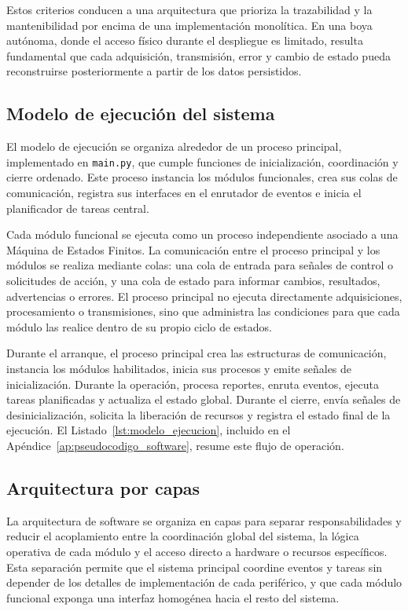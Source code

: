 Estos criterios conducen a una arquitectura que prioriza la trazabilidad y la mantenibilidad por encima de una implementación monolítica. En una boya autónoma, donde el acceso físico durante el despliegue es limitado, resulta fundamental que cada adquisición, transmisión, error y cambio de estado pueda reconstruirse posteriormente a partir de los datos persistidos.

\subsection{Modelo de ejecución del sistema}
\label{subsec:modelo_ejecucion}

El modelo de ejecución se organiza alrededor de un proceso principal, implementado en \texttt{main.py}, que cumple funciones de inicialización, coordinación y cierre ordenado. Este proceso instancia los módulos funcionales, crea sus colas de comunicación, registra sus interfaces en el enrutador de eventos e inicia el planificador de tareas central.

Cada módulo funcional se ejecuta como un proceso independiente asociado a una Máquina de Estados Finitos. La comunicación entre el proceso principal y los módulos se realiza mediante colas: una cola de entrada para señales de control o solicitudes de acción, y una cola de estado para informar cambios, resultados, advertencias o errores. El proceso principal no ejecuta directamente adquisiciones, procesamiento o transmisiones, sino que administra las condiciones para que cada módulo las realice dentro de su propio ciclo de estados.

Durante el arranque, el proceso principal crea las estructuras de comunicación, instancia los módulos habilitados, inicia sus procesos y emite señales de inicialización. Durante la operación, procesa reportes, enruta eventos, ejecuta tareas planificadas y actualiza el estado global. Durante el cierre, envía señales de desinicialización, solicita la liberación de recursos y registra el estado final de la ejecución. El Listado~\ref{lst:modelo_ejecucion}, incluido en el Apéndice~\ref{ap:pseudocodigo_software}, resume este flujo de operación.

\subsection{Arquitectura por capas}
\label{subsec:arquitectura_capas_software}

La arquitectura de software se organiza en capas para separar responsabilidades y reducir el acoplamiento entre la coordinación global del sistema, la lógica operativa de cada módulo y el acceso directo a hardware o recursos específicos. Esta separación permite que el sistema principal coordine eventos y tareas sin depender de los detalles de implementación de cada periférico, y que cada módulo funcional exponga una interfaz homogénea hacia el resto del sistema.

